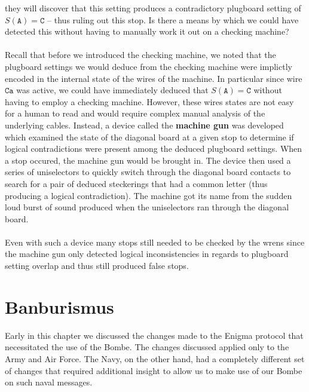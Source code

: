 they will discover that this setting produces a contradictory
plugboard setting of $S(\texttt{A}) = \texttt{C}$ -- thus ruling out
this stop. Is there a means by which we could have detected this
without having to manually work it out on a checking machine?
\\\\Recall that before we introduced the checking machine, we noted
that the plugboard settings we would deduce from the checking machine
were implictly encoded in the internal state of the wires of the
machine. In particular since wire $\texttt{Ca}$ was active, we could
have immediately deduced that $S(\texttt{A})= \texttt{C}$ without
having to employ a checking machine. However, these wires states are
not easy for a human to read and would require complex manual
analysis of the underlying cables. Instead, a device called the
	{\bf{machine gun}} was developed which examined the state of the
diagonal board at a given stop to determine if logical contradictions
were present among the deduced plugboard settings. When a stop
occured, the machine gun would be brought in. The device then used a
series of uniselectors to quickly switch through the diagonal board
contacts to search for a pair of deduced steckerings that had a
common letter (thus producing a logical contradiction). The machine
got its name from the sudden loud burst of sound produced when the
uniselectors ran through the diagonal board.
\\\\Even with such a device many stops still needed to be checked by
the wrens since the machine gun only detected logical inconsistencies
in regards to plugboard setting overlap and thus still produced false stops.

\section{Banburismus}
Early in this chapter we discussed the changes made to the Enigma
protocol that necessitated the use of the Bombe. The changes
discussed applied only to the Army and Air Force. The Navy, on the
other hand, had a completely different set of changes that required
additional insight to allow us to make use of our Bombe on such naval messages.

